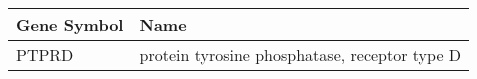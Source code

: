 \begin{tabular}{ll}
\toprule
Gene Symbol &                                          Name \\
\midrule
      PTPRD & protein tyrosine phosphatase, receptor type D \\
\bottomrule
\end{tabular}
